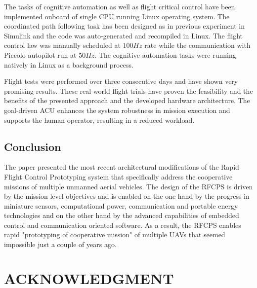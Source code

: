 \documentclass[letterpaper, 10 pt, conference]{ieeeconf}  %
\begin{document}
The tasks of cognitive automation as well as flight critical control have been implemented onboard of single CPU running Linux operating system. The coordinated path following task has been designed as in previous experiment in Simulink and the code was auto-generated and recompiled in Linux. The flight control law was manually scheduled at $100 Hz$ rate while the communication with Piccolo autopilot run at $50 Hz$. The cognitive automation tasks were running natively in Linux as a background process.

Flight tests were performed over three consecutive days and have shown very promising results. These real-world flight trials have proven the feasibility and the benefits of the presented approach and the developed hardware architecture. The goal-driven ACU enhances the system robustness in mission execution and supports the human operator, resulting in a reduced workload.

\subsection{Conclusion}
The paper presented the most recent architectural modifications of the Rapid Flight Control Prototyping system that specifically address the cooperative missions of multiple unmanned aerial vehicles. The design of the RFCPS is driven by the mission level objectives and is enabled on the one hand by the progress in miniature sensors, computational power, communication and portable energy technologies and on the other hand by the advanced capabilities of embedded control and communication oriented software. As a result, the RFCPS enables rapid "prototyping of cooperative mission" of multiple UAVs that seemed impossible just a couple of years ago. 

\addtolength{\textheight}{-12cm}   %


\section*{ACKNOWLEDGMENT}
\end{document}
